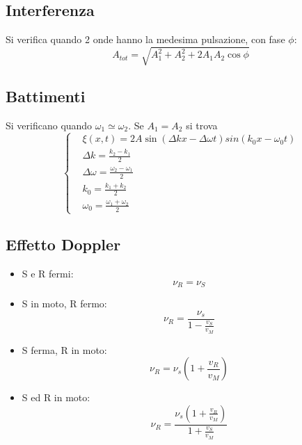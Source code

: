 \documentclass{article}
\begin{document}
\subsection{Interferenza}
Si verifica quando 2 onde hanno la medesima pulsazione, con fase $\phi$:
\begin{equation}
    A_{tot}= \sqrt{A_1^2+A_2^2+2A_1A_2\cos{\phi}}
\end{equation}

\subsection{Battimenti}
Si verificano quando $\omega_1\simeq\omega_2$. Se $A_1=A_2$ si trova
\begin{equation}
    \left\{
    \begin{aligned}
       & \xi(x,t)=2A\sin(\Delta kx-\Delta\omega t)sin(k_0x-\omega_0 t) \\
       & \Delta k= \frac{k_2-k_1}{2} \\
       & \Delta \omega= \frac{\omega_2-\omega_1}{2} \\
       & k_0= \frac{k_1+k_2}{2} \\
       & \omega_0= \frac{\omega_1+\omega_2}{2}
    \end{aligned}
\right.
\end{equation}

\subsection{Effetto Doppler}
\begin{itemize}
    \item S e R fermi:
    \begin{equation}
        \nu_R=\nu_S
    \end{equation}
    \item S in moto, R fermo:
    \begin{equation}
        \nu_R=\frac{\nu_s}{1-\frac{v_S}{v_M}}
    \end{equation}
    \item S ferma, R in moto:
        \begin{equation}
        \nu_R=\nu_s(1+\frac{v_R}{v_M})
    \end{equation}
    \item S ed R in moto:
        \begin{equation}
        \nu_R=\frac{\nu_s(1+\frac{v_R}{v_M})}{1+\frac{v_S}{v_M}}
    \end{equation}
\end{itemize}
\end{document}
